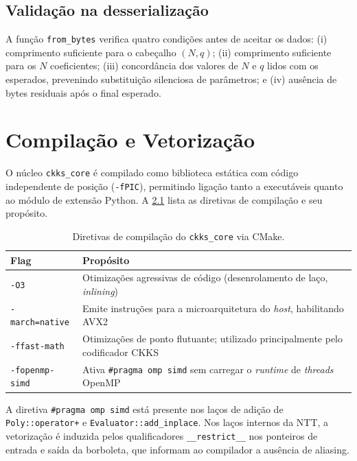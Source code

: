 \documentclass[11pt,a4paper]{report}
\begin{document}
\section{Validação na desserialização}
\label{sec:deser_validation}

A função \texttt{from\_bytes} verifica quatro condições antes de aceitar os dados:
(i) comprimento suficiente para o cabeçalho $(N, q)$; (ii) comprimento suficiente para
os $N$ coeficientes; (iii) concordância dos valores de $N$ e $q$ lidos com os esperados,
prevenindo substituição silenciosa de parâmetros; e (iv) ausência de bytes residuais após
o final esperado.

\chapter{Compilação e Vetorização}
\label{cap:build}

O núcleo \texttt{ckks\_core} é compilado como biblioteca estática com código independente
de posição (\texttt{-fPIC}), permitindo ligação tanto a executáveis quanto ao módulo de
extensão Python. A \cref{tab:flags} lista as diretivas de compilação e seu propósito.

\begin{table}[ht]
\centering
\caption{Diretivas de compilação do \texttt{ckks\_core} via CMake.}
\label{tab:flags}
\begin{tabular}{lp{9cm}}
\toprule
\textbf{Flag} & \textbf{Propósito} \\
\midrule
\texttt{-O3}             & Otimizações agressivas de código (desenrolamento de laço, \emph{inlining}) \\
\texttt{-march=native}   & Emite instruções para a microarquitetura do \emph{host}, habilitando AVX2 \\
\texttt{-ffast-math}     & Otimizações de ponto flutuante; utilizado principalmente pelo codificador CKKS \\
\texttt{-fopenmp-simd}   & Ativa \texttt{\#pragma omp simd} sem carregar o \emph{runtime} de \emph{threads} OpenMP \\
\bottomrule
\end{tabular}
\end{table}

A diretiva \texttt{\#pragma omp simd} está presente nos laços de adição de
\texttt{Poly::operator+} e \texttt{Evaluator::add\_inplace}. Nos laços internos da NTT,
a vetorização é induzida pelos qualificadores \texttt{\_\_restrict\_\_} nos ponteiros de
entrada e saída da borboleta, que informam ao compilador a ausência de aliasing.
\end{document}

